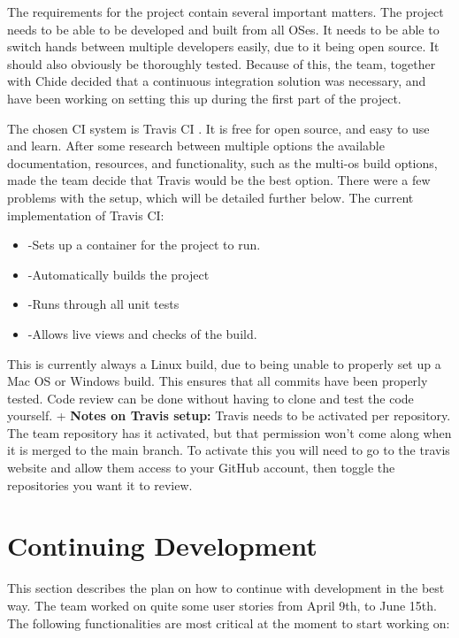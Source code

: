 \documentclass[10pt]{extarticle} %
\begin{document}
    The requirements for the project contain several important matters.
    The project needs to be able to be developed and built from all OSes.
    It needs to be able to switch hands between multiple developers easily, due to it being open source.
    It should also obviously be thoroughly tested.
    Because of this, the team, together with Chide decided that a continuous integration solution was necessary, and have been working on setting this up during the first part of the project.

    The chosen CI system is Travis CI .
    It is free for open source, and easy to use and learn.
    After some research between multiple options the available documentation, resources, and functionality, such as the multi-os build options, made the team decide that Travis would be the best option.
    There were a few problems with the setup, which will be detailed further below.
    The current implementation of Travis CI:
    \begin{itemize}
                 \item-Sets up a container for the project to run.
                 \item-Automatically builds the project
                 \item-Runs through all unit tests
                 \item-Allows live views and checks of the build.
             \end{itemize}
    This is currently always a Linux build, due to being unable to properly set up a Mac OS or Windows build.
    This ensures that all commits have been properly tested.
    Code review can be done without having to clone and test the code yourself.
    +
    \textbf{Notes on Travis setup:}
    Travis needs to be activated per repository.
    The team repository has it activated, but that permission won't come along when it is merged to the main branch.
    To activate this you will need to go to the travis website and allow them access to your GitHub account, then toggle the repositories you want it to review.

    \section{Continuing Development}
    This section describes the plan on how to continue with development in the best way.
    The team worked on quite some user stories from April 9th, to June 15th.
    The following functionalities are most critical at the moment to start working on:
\end{document}
